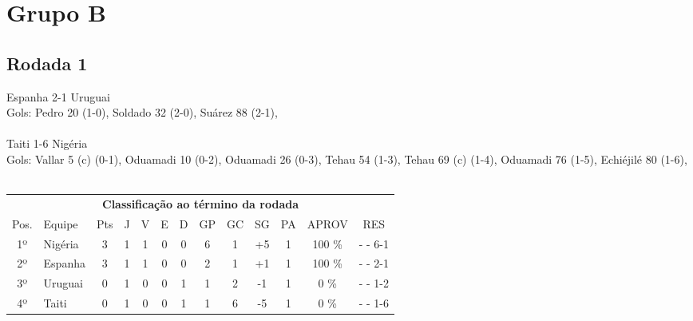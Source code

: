 \documentclass{article}
\begin{document}
\section*{Grupo B}
\subsection*{Rodada 1}
Espanha 2-1 Uruguai\\
Gols: Pedro 20 (1-0), Soldado 32 (2-0), Suárez 88 (2-1), \\
\\
Taiti 1-6 Nigéria\\
Gols: Vallar 5 (c) (0-1), Oduamadi 10 (0-2), Oduamadi 26 (0-3), Tehau 54 (1-3), Tehau 69 (c) (1-4), Oduamadi 76 (1-5), Echiéjilé 80 (1-6), \\
\\
\begin{center}
\begin{tabular}{| c | l | c | c | c | c | c | c | c | c | c | c | c |}
\multicolumn{13}{c}{\textbf{Classificação ao término da rodada}}\\
Pos.&Equipe&Pts&J&V&E&D&GP&GC&SG&PA&APROV&RES\\
1º&Nigéria             &3&1	&1&0&0	&6&1&+5	&1&100 \%	& -  - 6-1 \\
2º&Espanha             &3&1	&1&0&0	&2&1&+1	&1&100 \%	& -  - 2-1 \\
3º&Uruguai             &0&1	&0&0&1	&1&2&-1	&1&  0 \%	& -  - 1-2 \\
4º&Taiti               &0&1	&0&0&1	&1&6&-5	&1&  0 \%	& -  - 1-6 \\
\end{tabular}
\end{center}
\end{document}
